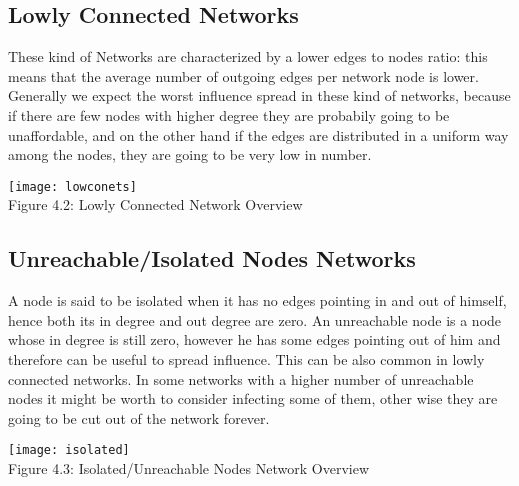 \subsection{Lowly Connected Networks}
\label{sec:lownets}
These kind of Networks are characterized by a lower edges to nodes ratio: this means that the average number of outgoing edges per network node is lower. Generally we expect the worst influence spread in these kind of networks, because if there are few nodes with higher degree they are probabily going to be unaffordable, and on the other hand if the edges are distributed in a uniform way among the nodes, they are going to be very low in number.
\begin{center}
    \texttt{[image: lowconets]}
    \\
    Figure 4.2: Lowly Connected Network Overview
\end{center}

\subsection{Unreachable/Isolated Nodes Networks}
\label{sec:isonets}
A node is said to be isolated when it has no edges pointing in and out of himself, hence both its in degree and out degree are zero. An unreachable node is a node whose in degree is still zero, however he has some edges pointing out of him and therefore can be useful to spread influence. This can be also common in lowly connected networks. In some networks with a higher number of unreachable nodes it might be worth to consider infecting some of them, other wise they are going to be cut out of the network forever.

\begin{center}
    \texttt{[image: isolated]}
    \\
    Figure 4.3: Isolated/Unreachable Nodes Network Overview
\end{center}


